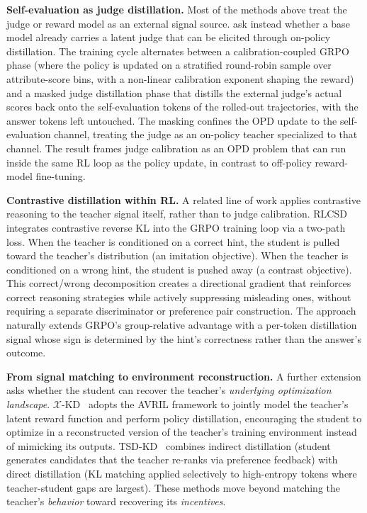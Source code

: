 \documentclass{article} %
\begin{document}
\textbf{Self-evaluation as judge distillation.} Most of the methods above treat the judge or reward model as an external signal source. \citet{2606.05122} ask instead whether a base model already carries a latent judge that can be elicited through on-policy distillation. The training cycle alternates between a calibration-coupled GRPO phase (where the policy is updated on a stratified round-robin sample over attribute-score bins, with a non-linear calibration exponent shaping the reward) and a masked judge distillation phase that distills the external judge's actual scores back onto the self-evaluation tokens of the rolled-out trajectories, with the answer tokens left untouched. The masking confines the OPD update to the self-evaluation channel, treating the judge as an on-policy teacher specialized to that channel. The result frames judge calibration as an OPD problem that can run inside the same RL loop as the policy update, in contrast to off-policy reward-model fine-tuning.

\textbf{Contrastive distillation within RL.} A related line of work applies contrastive reasoning to the teacher signal itself, rather than to judge calibration. RLCSD~\citep{2606.11709} integrates contrastive reverse KL into the GRPO training loop via a two-path loss. When the teacher is conditioned on a correct hint, the student is pulled toward the teacher's distribution (an imitation objective). When the teacher is conditioned on a wrong hint, the student is pushed away (a contrast objective). This correct/wrong decomposition creates a directional gradient that reinforces correct reasoning strategies while actively suppressing misleading ones, without requiring a separate discriminator or preference pair construction. The approach naturally extends GRPO's group-relative advantage with a per-token distillation signal whose sign is determined by the hint's correctness rather than the answer's outcome.

\textbf{From signal matching to environment reconstruction.} A further extension asks whether the student can recover the teacher's \emph{underlying optimization landscape}. $\mathcal{X}$-KD~\citep{2602.12674} adopts the AVRIL framework to jointly model the teacher's latent reward function and perform policy distillation, encouraging the student to optimize in a reconstructed version of the teacher's training environment instead of mimicking its outputs. TSD-KD~\citep{2603.13260} combines indirect distillation (student generates candidates that the teacher re-ranks via preference feedback) with direct distillation (KL matching applied selectively to high-entropy tokens where teacher-student gaps are largest). These methods move beyond matching the teacher's \emph{behavior} toward recovering its \emph{incentives}.
\end{document}
